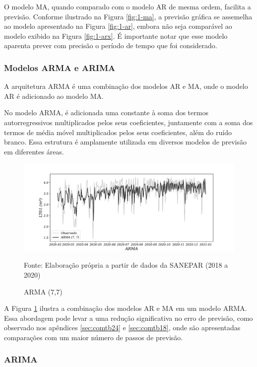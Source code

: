 O modelo MA, quando comparado com o modelo AR de mesma ordem, facilita a previsão. Conforme ilustrado na Figura \ref{fig:1-ma}, a previsão gráfica se assemelha ao modelo apresentado na Figura \ref{fig:1-ar}, embora não seja comparável ao modelo exibido na Figura \ref{fig:1-arx}. É importante notar que esse modelo aparenta prever com precisão o período de tempo que foi considerado.

\subsubsection{Modelos ARMA e ARIMA}\label{subsubsec:arma}
A arquitetura ARMA é uma combinação dos modelos AR  e MA, onde o modelo AR é adicionado ao modelo MA.

No modelo ARMA, é adicionada uma constante à soma dos termos autorregressivos multiplicados pelos seus coeficientes, juntamente com a soma dos termos de média móvel multiplicados pelos seus coeficientes, além do ruído branco. Essa estrutura é amplamente utilizada em diversos modelos de previsão em diferentes áreas.

\begin{figure}[H]
	\centering
	\caption{ARMA (7,7)}
	\label{fig:1-arma}
	\includegraphics[width=0.9\linewidth]{Modelos/Figuras/0-ARMA}
	
	Fonte: Elaboração própria a partir de dados da SANEPAR (2018 a 2020)
\end{figure}

A Figura \ref{fig:1-arma} ilustra a combinação dos modelos AR e MA em um modelo ARMA. Essa abordagem pode levar a uma redução significativa no erro de previsão, como observado nos apêndices \ref{sec:comtb24} e \ref{sec:comtb18}, onde são apresentadas comparações com um maior número de passos de previsão.

\subsubsection{ARIMA}

